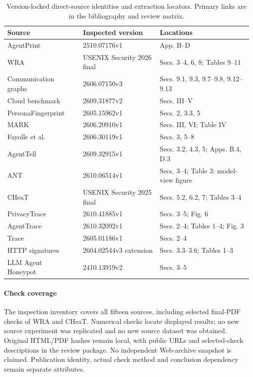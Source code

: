 \begin{table}[t]\centering\small
\caption{Version-locked direct-source identities and extraction locators. Primary links are in the bibliography and review matrix.}\label{tab:versions}
\begin{tabularx}{\textwidth}{@{}P{.29\textwidth}P{.32\textwidth}Y@{}}\toprule
Source & Inspected version & Locations \\\midrule
AgentPrint~\cite{agentprint2025} & 2510.07176v1 & App. B--D \\
WRA~\cite{jeong2026wra} & USENIX Security 2026 final & Secs. 3--4, 6, 8; Tables 9--11 \\
Communication graphs~\cite{dangol2026workflow} & 2606.07150v3 & Secs. 9.1, 9.3, 9.7--9.8, 9.12--9.13 \\
Cloud benchmark~\cite{pouryousef2026traffic} & 2609.31877v2 & Secs. III--V \\
PersonaFingerprint~\cite{song2026personafingerprint} & 2605.15962v1 & Secs. 2, 3.3, 5 \\
MARK~\cite{kang2026whoseagent} & 2606.20910v1 & Secs. III, VI; Table IV \\
Fayolle et al.~\cite{fayolle2026webagents} & 2606.30119v1 & Secs. 3, 5--8 \\
AgentTell~\cite{shahriar2026agenttell} & 2609.32915v1 & Secs. 3.2, 4.3, 5; Apps. B.4, D.3 \\
ANT~\cite{li2026ant} & 2610.06514v1 & Secs. 3--4; Table 3; model-view figure \\
CHeaT~\cite{ayzenshteyn2025cheat} & USENIX Security 2025 final & Secs. 5.2, 6.2, 7; Tables 3--4 \\
PrivacyTrace~\cite{duan2026privacytrace} & 2610.41885v1 & Secs. 3--5; Fig. 6 \\
AgentTrace~\cite{zhao2026agenttrace} & 2610.32092v1 & Secs. 2--4; Tables 1--4; Fig. 3 \\
Trace~\cite{ediga2026trace} & 2605.01186v1 & Secs. 2--4 \\
HTTP signatures~\cite{borysenko2026http} & 2604.02544v3 extension & Secs. 3.3--3.6; Tables 1--3 \\
LLM Agent Honeypot~\cite{reworr2024honeypot} & 2410.13919v2 & Secs. 3--5 \\
\bottomrule\end{tabularx}\end{table}

\paragraph{Check coverage} The inspection inventory covers all fifteen sources, including selected final-PDF checks of WRA and CHeaT. Numerical checks locate displayed results; no new source experiment was replicated and no new source dataset was obtained. Original HTML/PDF hashes remain local, with public URLs and selected-check descriptions in the review package. No independent Web-archive snapshot is claimed. Publication identity, actual check method and conclusion dependency remain separate attributes.

